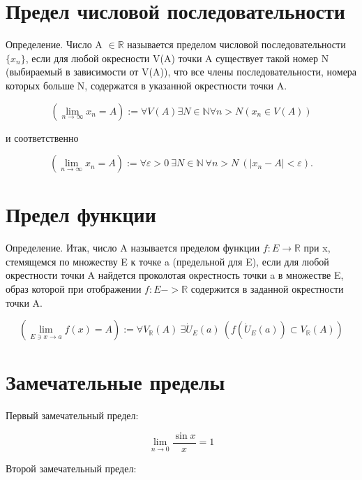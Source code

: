 \documentclass[a4paper, 12pt]{extarticle} %
\begin{document}
\section*{Предел числовой последовательности}
Определение. Число A $\in \mathbb{R}$ называется пределом числовой последовательности $\{x_n\}$, если для любой окресности V(A) точки A существует такой номер N (выбираемый в зависимости от V(A)), что все члены последовательности, номера которых больше N, содержатся в указанной окрестности точки A.


\begin{equation*}
    (\lim_{n\to\infty} x_{n} = A) := \forall V(A) \exists N \in \mathbb{N} \forall n > N (x_n \in V(A))
\end{equation*}

и соответственно

\begin{equation*}
    (\lim_{n \to \infty} x_{n} = A) := \forall \varepsilon > 0 \ \exists N \in \mathbb{N} \ \forall n > N \ (|x_n - A| < \varepsilon).
\end{equation*}

\clearpage

\section*{Предел функции}
Определение. Итак, число A называется пределом функции $f: E \to \mathbb{R}$ при x, стемящемся по множеству E к точке a (предельной для E), если для любой окрестности точки A найдется проколотая окрестность точки a в множестве E, образ которой при отображении $f : E -> \mathbb{R}$ содержится в заданной окрестности точки A.

\begin{equation*}
    (\lim_{E \ni x \to a} f(x) = A) := \forall V_\mathbb{R}(A) \ \exists \dot{U}_E(a) \ (f(\dot{U}_E(a)) \subset V_\mathbb{R}(A))
\end{equation*}

\clearpage
\section*{Замечательные пределы}

Первый замечательный предел:

\begin{equation*}
    \lim_{n \to 0} \frac{\sin x}{x} = 1
\end{equation*}

Второй замечательный предел:
\end{document}
